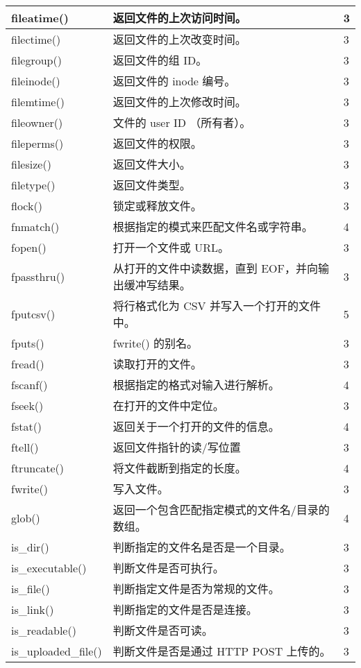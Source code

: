 \begin{longtable}{|m{120pt}|m{250pt}|m{20pt}|}
\hline
fileatime()	&返回文件的上次访问时间。	&3\\
\hline
filectime()	&返回文件的上次改变时间。	&3\\
\hline
filegroup()	&返回文件的组 ID。	&3\\
\hline
fileinode()	&返回文件的 inode 编号。	&3\\
\hline
filemtime()	&返回文件的上次修改时间。	&3\\
\hline
fileowner()	&文件的 user ID （所有者）。&	3\\
\hline
fileperms()	&返回文件的权限。	&3\\
\hline
filesize()	&返回文件大小。	&3\\
\hline
filetype()	&返回文件类型。	&3\\
\hline
flock()	&锁定或释放文件。	&3\\
\hline
fnmatch()	&根据指定的模式来匹配文件名或字符串。	&4\\
\hline
fopen()	&打开一个文件或 URL。	&3\\
\hline
fpassthru()&	从打开的文件中读数据，直到 EOF，并向输出缓冲写结果。	&3\\
\hline
fputcsv()	&将行格式化为 CSV 并写入一个打开的文件中。	&5\\
\hline
fputs()	&fwrite() 的别名。	&3\\
\hline
fread()	&读取打开的文件。	&3\\
\hline
fscanf()	&根据指定的格式对输入进行解析。	&4\\
\hline
fseek()	&在打开的文件中定位。	&3\\
\hline
fstat()	&返回关于一个打开的文件的信息。	&4\\
\hline
ftell()	&返回文件指针的读/写位置	&3\\
\hline
ftruncate()	&将文件截断到指定的长度。&	4\\
\hline
fwrite()	&写入文件。	&3\\
\hline
glob()	&返回一个包含匹配指定模式的文件名/目录的数组。	&4\\
\hline
is\_dir()	&判断指定的文件名是否是一个目录。	&3\\
\hline
is\_executable()	&判断文件是否可执行。	&3\\
\hline
is\_file()	&判断指定文件是否为常规的文件。&	3\\
\hline
is\_link()	&判断指定的文件是否是连接。&	3\\
\hline
is\_readable()	&判断文件是否可读。	&3\\
\hline
is\_uploaded\_file()	&判断文件是否是通过 HTTP POST 上传的。	&3\\

\end{longtable}
